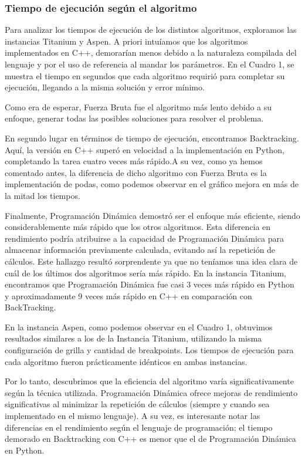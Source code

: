 \documentclass{article}
\begin{document}
    \subsubsection{Tiempo de ejecución según el algoritmo}
    Para analizar los tiempos de ejecución de los distintos algoritmos, exploramos las instancias Titanium y Aspen. A priori intuíamos que los algoritmos implementados en C++, demorarían menos debido a la naturaleza compilada del lenguaje y por el uso de referencia al mandar los parámetros. En el Cuadro 1, se muestra el tiempo en segundos que cada algoritmo requirió para completar su ejecución, llegando a la misma solución y error mínimo. 
    
    Como era de esperar, Fuerza Bruta fue el algoritmo más lento debido a su enfoque, generar todas las posibles soluciones para resolver el problema.

    En segundo lugar en términos de tiempo de ejecución, encontramos Backtracking. Aquí, la versión en C++ superó en velocidad a la implementación en Python, completando la tarea cuatro veces más rápido.A su vez, como ya hemos comentado antes, la diferencia de dicho algoritmo con Fuerza Bruta es la implementación de podas, como podemos observar en el gráfico mejora en más de la mitad los tiempos. 

    Finalmente, Programación Dinámica demostró ser el enfoque más eficiente, siendo considerablemente más rápido que los otros algoritmos. Esta diferencia en rendimiento podría atribuirse a la capacidad de Programación Dinámica para almacenar información previamente calculada, evitando así la repetición de cálculos. Este hallazgo resultó sorprendente ya que no teníamos una idea clara de cuál de los últimos dos algoritmos sería más rápido. En la instancia Titanium, encontramos que Programación Dinámica fue casi 3 veces más rápido en Python y aproximadamente 9 veces más rápido en C++ en comparación con BackTracking.
 

    En la instancia Aspen, como podemos observar en el Cuadro 1, obtuvimos resultados similares a los de la Instancia Titanium, utilizando la misma configuración de grilla y cantidad de breakpoints. Los tiempos de ejecución para cada algoritmo fueron prácticamente idénticos en ambas instancias. 

    Por lo tanto, descubrimos que la eficiencia del algoritmo varía significativamente según la técnica utilizada. Programación Dinámica ofrece mejoras de rendimiento significativas al minimizar la repetición de cálculos (siempre y cuando sea implementado en el mismo lenguaje). A su vez, es interesante notar las diferencias en el rendimiento según el lenguaje de programación; el tiempo demorado en Backtracking con C++ es menor que el de Programación Dinámica en Python.
\end{document}

